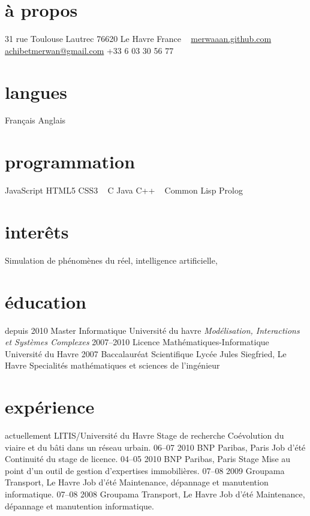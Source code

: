 \documentclass[]{friggeri-cv}
\begin{document}
       {}

\begin{aside}
  \section{à propos}
    31 rue Toulouse Lautrec
    76620 Le Havre
    France
    ~
    \href{http://merwaaan.github.com}{merwaaan.github.com}
    ~
    \href{mailto:achibetmerwan@gmail.com}{achibetmerwan@gmail.com}
    +33 6 03 30 56 77
  \section{langues}
    Français
    Anglais
  \section{programmation}
    JavaScript
    HTML5
    CSS3
    ~
    C
    Java
    C++
    ~
    Common Lisp
    Prolog
\end{aside}

\section{interêts}

Simulation de phénomènes du réel, intelligence artificielle,

\section{éducation}

\begin{entrylist}
  \entry
    {depuis 2010}
    {Master Informatique}
    {Université du havre}
    {\textit{Modélisation, Interactions et Systèmes Complexes}}
  \entry
    {2007–2010}
    {Licence Mathématiques-Informatique}
    {Université du Havre}
    {}
  \entry
    {2007}
    {Baccalauréat Scientifique}
    {Lycée Jules Siegfried, Le Havre}
    {Specialités mathématiques et sciences de l'ingénieur}
\end{entrylist}

\section{expérience}

\begin{entrylist}
  \entry
    {actuellement}
    {LITIS/Université du Havre}
    {Stage de recherche}
    {Coévolution du viaire et du bâti dans un réseau urbain.}
  \entry
    {06–07 2010}
    {BNP Paribas, Paris}
    {Job d'été}
    {Continuité du stage de licence.}
  \entry
    {04–05 2010}
    {BNP Paribas, Paris}
    {Stage}
    {Mise au point d'un outil de gestion d'expertises immobilières.}
  \entry
    {07–08 2009}
    {Groupama Transport, Le Havre}
    {Job d'été}
    {Maintenance, dépannage et manutention informatique.}
  \entry
    {07–08 2008}
    {Groupama Transport, Le Havre}
    {Job d'été}
    {Maintenance, dépannage et manutention informatique.}
\end{entrylist}
\end{document}
